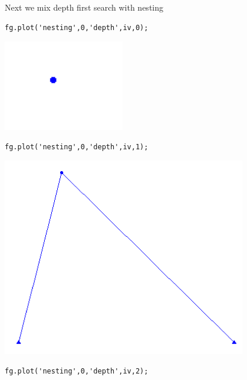 Next we mix depth first search with nesting


\begin{lstlisting}
fg.plot('nesting',0,'depth',iv,0);
\end{lstlisting}

\includegraphics{images/plot14.png}
 

 
\begin{lstlisting}
fg.plot('nesting',0,'depth',iv,1);
\end{lstlisting}

\includegraphics{images/plot15.png}
 

 
\begin{lstlisting}
fg.plot('nesting',0,'depth',iv,2);
\end{lstlisting}


